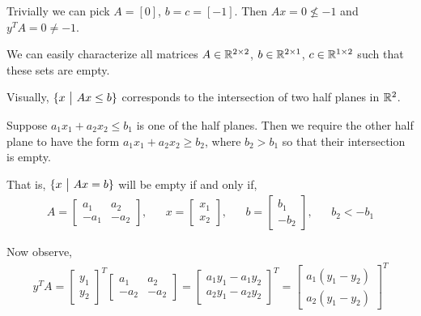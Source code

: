 \documentclass[10pt]{article}
\begin{document}
\begin{solution}

Trivially we can pick \( A=[0] \), \( b=c=[-1] \). Then \( Ax = 0 \nleq -1 \) and \( y^TA = 0 \neq -1 \).

\vspace{1em}
We can easily characterize all matrices \( A\in\mathbb{R}^{2\times 2} \), \( b\in\mathbb{R}^{2\times 1} \), \( c\in\mathbb{R}^{1\times 2} \) such that these sets are empty.

Visually, \( \{x~\big|~ Ax \leq b \} \) corresponds to the intersection of two half planes in \( \mathbb{R}^{2} \). %

Suppose \( a_1x_1 + a_2x_2 \leq b_1 \) is one of the half planes. Then we require the other half plane to have the form \( a_1x_1 + a_2x_2 \geq b_2
\), where \( b_2 > b_1 \) so that their intersection is empty.

That is, \( \{x ~\big|~ Ax = b \} \) will be empty if and only if,
\begin{align*}
    A = \left[\begin{array}{rr}a_1 & a_2 \\ -a_1 & -a_2\end{array}\right], && x = \left[\begin{array}{r}x_1 \\ x_2 \end{array}\right],
        && b = \left[\begin{array}{r}b_1 \\ -b_2\end{array}\right], && b_2 < -b_1
\end{align*}

Now observe, 
\begin{align*}
    y^TA = \left[\begin{array}{rr}y_1 \\ y_2\end{array}\right]^T
        \left[\begin{array}{rr}a_1 & a_2 \\ -a_2 & -a_2\end{array}\right] = \left[\begin{array}{r}a_1y_1 - a_1y_2 \\ a_2y_1 - a_2y_2 \end{array}\right]^T 
            =\left[\begin{array}{r}a_1(y_1-y_2) \\ a_2(y_1-y_2)\end{array}\right]^T
\end{align*}


\end{solution}
\end{document}
